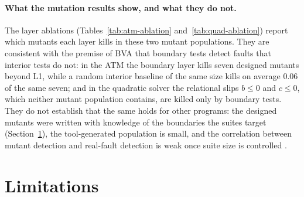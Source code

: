 \documentclass[11pt,a4paper]{article}
\begin{document}
\paragraph{What the mutation results show, and what they do not.} The layer
ablations (Tables~\ref{tab:atm-ablation} and~\ref{tab:quad-ablation}) report
which mutants each layer kills in these two mutant populations. They are
consistent with the premise of BVA that boundary tests detect faults that
interior tests do not: in the ATM the boundary layer kills seven designed
mutants beyond L1, while a random interior baseline of the same size kills
on average 0.06 of the same seven; and in the quadratic solver the relational
slips \(b\le0\) and \(c\le0\), which neither mutant population contains, are
killed only by boundary tests. They do not establish that the same holds for other
programs: the designed mutants were written with knowledge of the
boundaries the suites target (Section~\ref{sec:limitations}), the
tool-generated population is small, and the correlation between mutant
detection and real-fault detection is weak once suite size is controlled
\cite{papadakis2018}.
\section{Limitations}
\label{sec:limitations}
\end{document}
